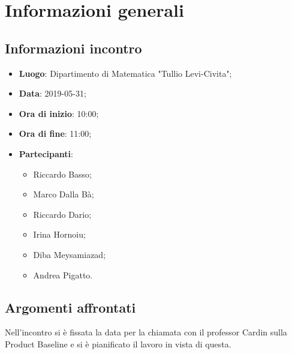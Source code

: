 \section{Informazioni generali}

\subsection{Informazioni incontro}
\begin{itemize}
	\item \textbf{Luogo}: Dipartimento di Matematica "Tullio Levi-Civita";
	\item \textbf{Data}: 2019-05-31;
	\item \textbf{Ora di inizio}: 10:00;
	\item \textbf{Ora di fine}: 11:00;
	\item \textbf{Partecipanti}: 
	\begin{itemize}
		\item Riccardo Basso;
		\item Marco Dalla Bà;
		\item Riccardo Dario;
		\item Irina Hornoiu;
		\item Diba Meysamiazad;
		\item Andrea Pigatto.	
	\end{itemize}
\end{itemize}

\subsection{Argomenti affrontati}
Nell'incontro si è fissata la data per la chiamata con il professor Cardin sulla Product Baseline e si è pianificato il lavoro in vista di questa.

